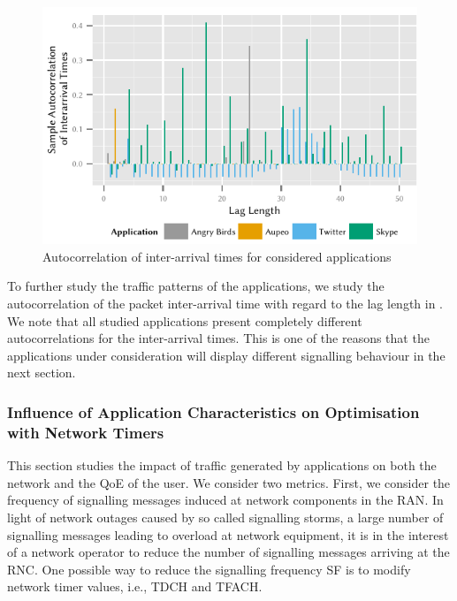 \begin{figure}
\centering
\includegraphics{network/network_traces/numerical_results/figures/autocorrelation}
\caption{Autocorrelation of inter-arrival times for considered applications}\label{fig:network:network_traces:numerical_results:traffic:autocorrelation}
\end{figure}

To further study the traffic patterns of the applications, we study the autocorrelation of the packet inter-arrival time with regard to the lag length in .
We note that all studied applications present completely different autocorrelations for the inter-arrival times.
This is one of the reasons that the applications under consideration will display different signalling behaviour in the next section.

\subsubsection*{Influence of Application Characteristics on Optimisation with Network Timers}\label{sec:network:network_traces:numerical_results:application_influence}
This section studies the impact of traffic generated by applications on both the network and the
\gls{QoE} of the user.
We consider two metrics.
First, we consider the frequency of signalling messages induced at network components in the \gls{RAN}.
In light of network outages caused by so called signalling storms, a large number of signalling messages leading to overload at network equipment, it is in the interest of a network operator to reduce the number of signalling messages arriving at the \gls{RNC}.
One possible way to reduce the signalling frequency \gls{SF} is to modify network timer values, i.e., \gls{TDCH} and \gls{TFACH}.

